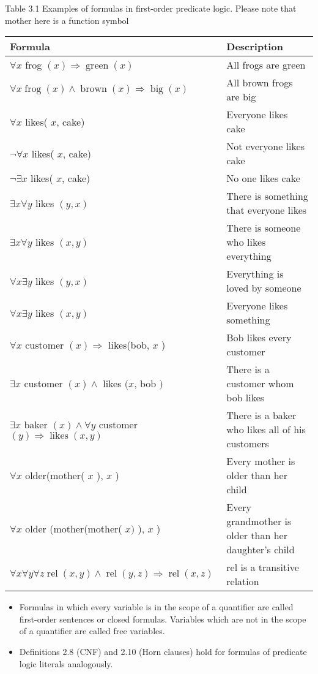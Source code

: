 \documentclass[10pt]{article}
\begin{document}
Table 3.1 Examples of formulas in first-order predicate logic. Please note that mother here is a function symbol

\begin{center}
\begin{tabular}{|l|l|}
\hline
Formula & Description \\
\hline
$\forall x$ frog $(x) \Rightarrow \operatorname{green}(x)$ & All frogs are green \\
\hline
$\forall x \operatorname{frog}(x) \wedge \operatorname{brown}(x) \Rightarrow \operatorname{big}(x)$ & All brown frogs are big \\
\hline
$\forall x$ likes( $x$, cake) & Everyone likes cake \\
\hline
$\neg \forall x$ likes( $x$, cake) & Not everyone likes cake \\
\hline
$\neg \exists x$ likes( $x$, cake) & No one likes cake \\
\hline
$\exists x \forall y$ likes $(y, x)$ & There is something that everyone likes \\
\hline
$\exists x \forall y$ likes $(x, y)$ & There is someone who likes everything \\
\hline
$\forall x \exists y$ likes $(y, x)$ & Everything is loved by someone \\
\hline
$\forall x \exists y$ likes $(x, y)$ & Everyone likes something \\
\hline
$\forall x$ customer $(x) \Rightarrow$ likes(bob, $x$ ) & Bob likes every customer \\
\hline
$\exists x$ customer $(x) \wedge$ likes $(x$, bob $)$ & There is a customer whom bob likes \\
\hline
$\exists x$ baker $(x) \wedge \forall y$ customer $(y) \Rightarrow \operatorname{likes}(x, y)$ & There is a baker who likes all of his customers \\
\hline
$\forall x$ older(mother( $x$ ), $x$ ) & Every mother is older than her child \\
\hline
$\forall x$ older (mother(mother( $x)$ ), $x$ ) & Every grandmother is older than her daughter's child \\
\hline
$\forall x \forall y \forall z \operatorname{rel}(x, y) \wedge \operatorname{rel}(y, z) \Rightarrow \operatorname{rel}(x, z)$ & rel is a transitive relation \\
\hline
\end{tabular}
\end{center}

\begin{itemize}
  \item Formulas in which every variable is in the scope of a quantifier are called first-order sentences or closed formulas. Variables which are not in the scope of a quantifier are called free variables.
  \item Definitions 2.8 (CNF) and 2.10 (Horn clauses) hold for formulas of predicate logic literals analogously.
\end{itemize}
\end{document}
